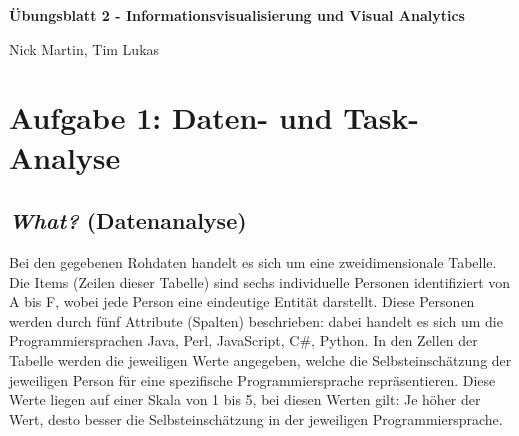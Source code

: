 \documentclass[12pt, a4paper]{article}
\begin{document}
\begin{center}
    \vspace*{1cm}
    {\Large \textbf{Übungsblatt 2 - Informationsvisualisierung und Visual Analytics}}
\end{center}
\begin{center}
    {\Large Nick Martin, Tim Lukas}
    \vspace*{1cm}
\end{center}

\section*{Aufgabe 1: Daten- und Task-Analyse}

\subsection*{\textit{What?} (Datenanalyse)}
Bei den gegebenen Rohdaten handelt es sich um eine zweidimensionale Tabelle.
Die Items (Zeilen dieser Tabelle) sind sechs individuelle Personen identifiziert von A bis F, wobei jede Person eine eindeutige Entität darstellt.
Diese Personen werden durch fünf Attribute (Spalten) beschrieben: dabei handelt es sich um die Programmiersprachen Java, Perl, JavaScript, C\#, Python.
In den Zellen der Tabelle werden die jeweiligen Werte angegeben, welche die Selbsteinschätzung der jeweiligen Person für eine spezifische Programmiersprache
repräsentieren. Diese Werte liegen auf einer Skala von 1 bis 5, bei diesen Werten gilt: Je höher der Wert, desto besser die Selbsteinschätzung in der jeweiligen Programmiersprache.

\end{document}
